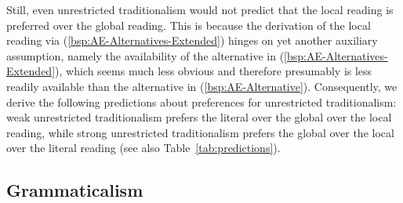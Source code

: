\documentclass[fleqn,reqno,10pt,draft]{article}
\begin{document}
Still, even unrestricted traditionalism would not predict that the
local reading is preferred over the global reading. This is because
the derivation of the local reading via
(\ref{bsp:AE-Alternatives-Extended}) hinges on yet another auxiliary
assumption, namely the availability of the alternative in
(\ref{bsp:AE-Alternatives-Extended}), which seems much less obvious
and therefore presumably is less readily available than the
alternative in (\ref{bsp:AE-Alternative}). Consequently, we derive the
following predictions about preferences for unrestricted
traditionalism: weak unrestricted traditionalism prefers the literal
over the global over the local reading, while strong unrestricted
traditionalism prefers the global over the local over the literal
reading (see also Table~\ref{tab:predictions}).

\subsection{Grammaticalism}
\label{sec:grammaticalism}
\end{document}
